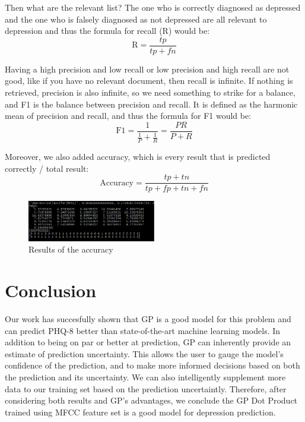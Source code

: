 \documentclass{article}
\begin{document}
 	Then what are the relevant list? The one who is correctly diagnosed as depressed and the one who is falsely diagnosed as not depressed are all relevant to depression and thus the formula for recall (R) would be:
    \begin{equation}\label{eq:recall}
  	\text{R} = \frac{tp}{tp + fn}
 	\end{equation}

 	Having a high precision and low recall or low precision and high recall are not good, like if you have no relevant document, then recall is infinite.
    If nothing is retrieved, precision is also infinite, so we need something to strike for a balance, and F1 is the balance between precision and recall. It is defined as the harmonic mean of precision and recall, and thus the formula for F1 would be:
    \begin{equation}\label{eq:balance}
  	\text{F1} = \frac{1}{\frac{1}{P} + \frac{1}{R}} = \frac{PR}{P + R}
 	\end{equation}

    Moreover, we also added accuracy, which is every result that is predicted correctly / total result:
    \begin{equation}\label{eq:accuracy}
  	\text{Accuracy} = \frac{tp + tn}{tp + fp + tn + fn}
 	\end{equation}

    \begin{figure}[h]
        \begin{center}
        \includegraphics[width=0.5\textwidth]{accu_results}
        \end{center}
        \caption{Results of the accuracy}
        \label{accu_results}
    \end{figure}


	\section{Conclusion}	
	Our work has succesfully shown that GP is a good model for this problem and can predict PHQ-8 better than state-of-the-art machine learning models. 
	In addition to being on par or better at prediction, GP can inherently provide an estimate of prediction uncertainty. 
	This allows the user to gauge the model's confidence of the prediction, and to make more informed decisions based on both the prediction and its uncertainty. 
	We can also intelligently supplement more data to our training set based on the prediction uncertaintly. 
	Therefore, after considering both results and GP's advantages, we conclude the GP Dot Product trained using MFCC feature set is a good model for 
	depression prediction.
	
\end{document}
